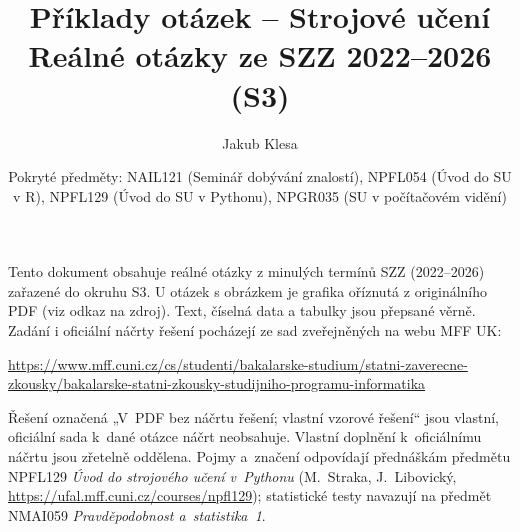 \documentclass[11pt,a4paper]{article}
\title{Příklady otázek -- Strojové učení\\[0.3em]\large Reálné otázky ze SZZ 2022--2026 (S3)}
\author{Jakub Klesa}
\date{Pokryté předměty: NAIL121 (Seminář dobývání znalostí), NPFL054 (Úvod do SU v R), NPFL129 (Úvod do SU v Pythonu), NPGR035 (SU v počítačovém vidění)}
\begin{document}
\sloppy
\maketitle
\tableofcontents
\bigskip

\begin{poznamka}
Tento dokument obsahuje reálné otázky z minulých termínů SZZ (2022--2026) zařazené do
okruhu S3. U otázek s obrázkem je grafika oříznutá z originálního PDF (viz odkaz na
zdroj). Text, číselná data a tabulky jsou přepsané věrně.
Zadání i oficiální náčrty řešení pocházejí ze sad zveřejněných na webu MFF UK:\par
{\raggedright\url{https://www.mff.cuni.cz/cs/studenti/bakalarske-studium/statni-zaverecne-zkousky/bakalarske-statni-zkousky-studijniho-programu-informatika}\par}
Řešení označená „V~PDF bez náčrtu řešení; vlastní vzorové řešení`` jsou vlastní, oficiální sada k~dané otázce náčrt neobsahuje.
Vlastní doplnění k~oficiálnímu náčrtu jsou zřetelně oddělena.
Pojmy a~značení odpovídají přednáškám předmětu NPFL129 \emph{Úvod do strojového učení v~Pythonu}
(M.~Straka, J.~Libovický, \url{https://ufal.mff.cuni.cz/courses/npfl129}); statistické testy
navazují na předmět NMAI059 \emph{Pravděpodobnost a~statistika~1}.
\end{poznamka}
\bigskip




































\end{document}
